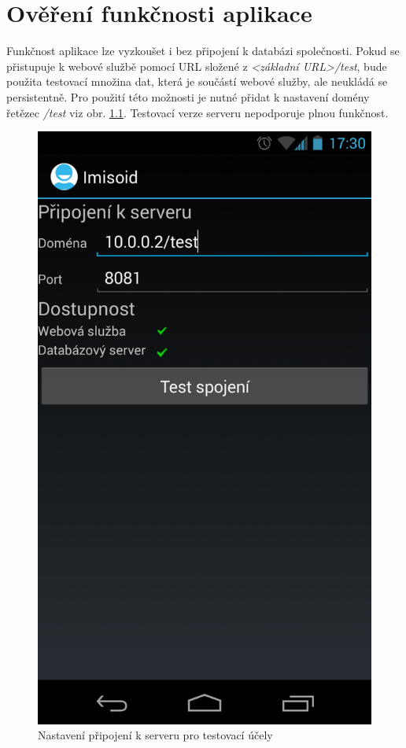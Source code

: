\documentclass{diplomka}
\begin{document}
\chapter{Ověření funkčnosti aplikace}
Funkčnost aplikace lze vyzkoušet i bez připojení k databázi společnosti. Pokud se přistupuje k webové službě pomocí URL složené z \emph{<základní URL>/test}, bude použita testovací množina dat, která je součástí webové služby, ale neukládá se persistentně. Pro použití této možnosti je nutné přidat k nastavení domény řetězec \emph{/test} viz obr. \ref{fig:test}. 
Testovací verze serveru nepodporuje plnou funkčnost.
\begin{figure}[H]
  \centering
  \includegraphics[scale=0.25]{scr/test.png}
  \caption{Nastavení připojení k serveru pro testovací účely}
  \label{fig:test}
\end{figure}
\end{document}
